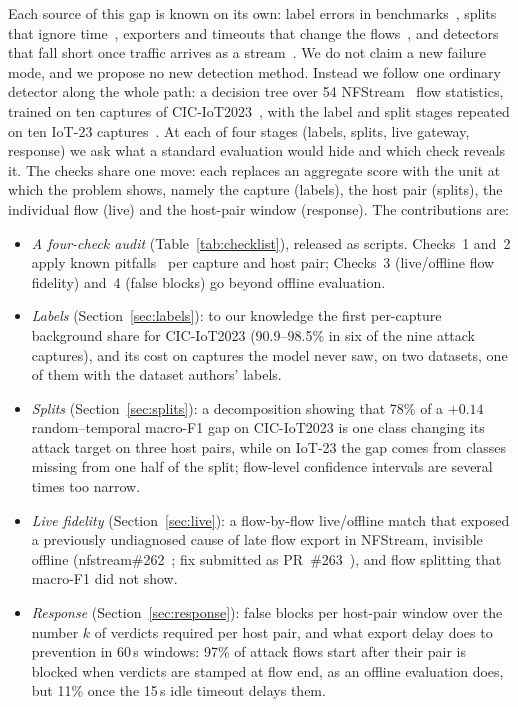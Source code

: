 Each source of this gap is known on its own: label errors in benchmarks~\cite{engelen2021troubleshooting,liu2022error,lanvin2023errors,flood2024smells}, splits that ignore time~\cite{pendlebury2019tesseract,arp2022dos,andresini2021insomnia}, exporters and timeouts that change the flows~\cite{velan2020impact,pinto2025flowexporter}, and detectors that fall short once traffic arrives as a stream~\cite{pekar2025early,zhao2026gidseval}. We do not claim a new failure mode, and we propose no new detection method. Instead we follow one ordinary detector along the whole path: a decision tree over 54 NFStream~\cite{aouini2022nfstream} flow statistics, trained on ten captures of CIC-IoT2023~\cite{neto2023ciciot2023}, with the label and split stages repeated on ten IoT-23 captures~\cite{garcia2020iot23}. At each of four stages (labels, splits, live gateway, response) we ask what a standard evaluation would hide and which check reveals it. The checks share one move: each replaces an aggregate score with the unit at which the problem shows, namely the capture (labels), the host pair (splits), the individual flow (live) and the host-pair window (response). The contributions are:
\begin{itemize}
\item \emph{A four-check audit} (Table~\ref{tab:checklist}), released as scripts. Checks~1 and~2 apply known pitfalls~\cite{arp2022dos,flood2024smells} per capture and host pair; Checks~3 (live/offline flow fidelity) and~4 (false blocks) go beyond offline evaluation.
\item \emph{Labels} (Section~\ref{sec:labels}): to our knowledge the first per-capture background share for CIC-IoT2023 (90.9--98.5\% in six of the nine attack captures), and its cost on captures the model never saw, on two datasets, one of them with the dataset authors' labels.
\item \emph{Splits} (Section~\ref{sec:splits}): a decomposition showing that 78\% of a $+0.14$ random--temporal macro-F1 gap on CIC-IoT2023 is one class changing its attack target on three host pairs, while on IoT-23 the gap comes from classes missing from one half of the split; flow-level confidence intervals are several times too narrow.
\item \emph{Live fidelity} (Section~\ref{sec:live}): a flow-by-flow live/offline match that exposed a previously undiagnosed cause of late flow export in NFStream, invisible offline (nfstream\#262~\cite{nfstream262}; fix submitted as PR~\#263~\cite{nfstream263}), and flow splitting that macro-F1 did not show.
\item \emph{Response} (Section~\ref{sec:response}): false blocks per host-pair window over the number $k$ of verdicts required per host pair, and what export delay does to prevention in 60\,s windows: 97\% of attack flows start after their pair is blocked when verdicts are stamped at flow end, as an offline evaluation does, but 11\% once the 15\,s idle timeout delays them.
\end{itemize}

